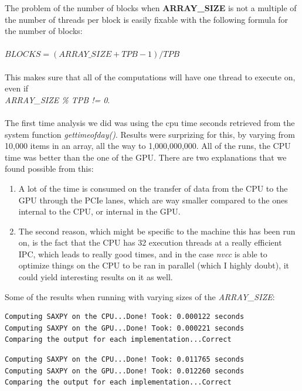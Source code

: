 \documentclass[english]{exam}
\begin{document}
The problem of the number of blocks when \textbf{ARRAY\_SIZE} is not a multiple of the number of threads per block is easily fixable with the following formula for the number of blocks:\\\\
$BLOCKS = (ARRAY\_SIZE + TPB - 1) / TPB$
\\\\
This makes sure that all of the computations will have one thread to execute on, even if \\ \textit{ARRAY\_SIZE \% TPB != 0}.
\\\\
\noindent
The first time analysis we did was using the cpu time seconds retrieved from the system function \textit{gettimeofday()}. Results were surprizing for this, by varying from 10,000 items in an array, all the way to 1,000,000,000. All of the runs, the CPU time was better than the one of the GPU. There are two explanations that we found possible from this:

\begin{enumerate}
\item A lot of the time is consumed on the transfer of data from the CPU to the GPU through the PCIe lanes, which are way smaller compared to the ones internal to the CPU, or internal in the GPU.
\item The second reason, which might be specific to the machine this has been run on, is the fact that the CPU has 32 execution threads at a really efficient IPC, which leads to really good times, and in the case \textit{nvcc} is able to optimize things on the CPU to be ran in parallel (which I highly doubt), it could yield interesting results on it as well.
\end{enumerate}

\noindent
Some of the results when running with varying sizes of the \textit{ARRAY\_SIZE}:\\

\begin{lstlisting}
Computing SAXPY on the CPU...Done! Took: 0.000122 seconds
Computing SAXPY on the GPU...Done! Took: 0.000221 seconds
Comparing the output for each implementation...Correct
\end{lstlisting}

\begin{lstlisting}
Computing SAXPY on the CPU...Done! Took: 0.011765 seconds
Computing SAXPY on the GPU...Done! Took: 0.012260 seconds
Comparing the output for each implementation...Correct
\end{lstlisting}
\end{document}
